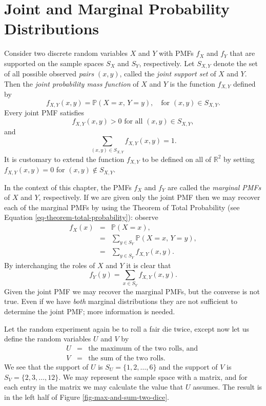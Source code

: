 \section{Joint and Marginal Probability Distributions}
\label{sec-7-1}

Consider two discrete random variables \(X\) and \(Y\) with PMFs
\(f_{X}\) and \(f_{Y}\) that are supported on the sample spaces
\(S_{X}\) and \(S_{Y}\), respectively. Let \(S_{X,Y}\) denote the set
of all possible observed \emph{pairs} \((x,y)\), called the \emph{joint support
set} of \(X\) and \(Y\). Then the \emph{joint probability mass function} of
\(X\) and \(Y\) is the function \(f_{X,Y}\) defined by
\begin{equation}
\label{eq-joint-pmf}
f_{X,Y}(x,y)=\mathbb{P}(X=x,\, Y=y),\quad \mbox{for }(x,y)\in S_{X,Y}.
\end{equation}
Every joint PMF satisfies
\begin{equation}
f_{X,Y}(x,y)>0\mbox{ for all }(x,y)\in S_{X,Y},
\end{equation}
and
\begin{equation}
\sum_{(x,y)\in S_{X,Y}}f_{X,Y}(x,y)=1.
\end{equation}
It is customary to extend the function \(f_{X,Y}\) to be defined on
all of \(\mathbb{R}^{2}\) by setting \(f_{X,Y}(x,y)=0\) for
\((x,y)\not\in S_{X,Y}\).

In the context of this chapter, the PMFs \(f_{X}\) and \(f_{Y}\) are
called the \emph{marginal PMFs} of \(X\) and \(Y\), respectively. If we are
given only the joint PMF then we may recover each of the marginal PMFs
by using the Theorem of Total Probability (see Equation
\eqref{eq-theorem-total-probability}): observe
\begin{eqnarray}
f_{X}(x) & = & \mathbb{P}(X=x),\\
 & = & \sum_{y\in S_{Y}}\mathbb{P}(X=x,\, Y=y),\\
 & = & \sum_{y\in S_{Y}}f_{X,Y}(x,y).
\end{eqnarray}
By interchanging the roles of \(X\) and \(Y\) it is clear that 
\begin{equation}
\label{eq-marginal-pmf}
f_{Y}(y)=\sum_{x\in S_{Y}}f_{X,Y}(x,y).
\end{equation}
Given the joint PMF we may recover the marginal PMFs, but the converse
is not true. Even if we have \emph{both} marginal distributions they are
not sufficient to determine the joint PMF; more information is
needed.

\label{exa-max-sum-two-dice} Let the random experiment again be to roll a
fair die twice, except now let us define the random variables \(U\)
and \(V\) by
\begin{eqnarray*}
U & = & \mbox{the maximum of the two rolls, and }\\
V & = & \mbox{the sum of the two rolls.}
\end{eqnarray*}
We see that the support of \(U\) is \(S_{U}= \{ 1,2,\ldots,6 \} \) and
the support of \(V\) is \(S_{V}= \{ 2,3,\ldots,12 \} \). We may
represent the sample space with a matrix, and for each entry in the
matrix we may calculate the value that \(U\) assumes. The result is in
the left half of Figure \ref{fig-max-and-sum-two-dice}.

